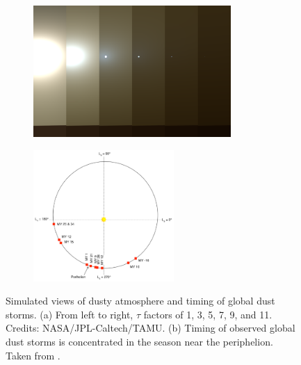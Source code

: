 \begin{figure}[h]
\captionsetup[subfigure]{justification=centering}
\centering
    \hypersetup{hidelinks=true}%
    \begin{subfigure}[t]{0.55\textwidth}
        \centering
            \includegraphics[height=50mm]{sections/mars-solar-energy/solar-radiation/images/tau-factors.png}
            \label{fig:image:tau-factors}
    \end{subfigure}\hfill%
    \begin{subfigure}[t]{0.45\textwidth}
        \centering
            \includegraphics[height=50mm]{sections/mars-solar-energy/solar-radiation/images/timin-of-observed-global-dust-storms.png}
            \label{fig:image:global-dust-storm-timing}
    \end{subfigure}
    \caption[Simulated views of dusty atmosphere and timing of global dust storms]
    {Simulated views of dusty atmosphere and timing of global dust storms. (a) From left to right, $\tau$ factors of 1, 3, 5, 7, 9, and 11. Credits: NASA/JPL-Caltech/TAMU. (b) Timing of observed global dust storms is concentrated in the season near the periphelion. Taken from .}
    \label{fig:dust}
\vspace{-2ex}
\end{figure}


